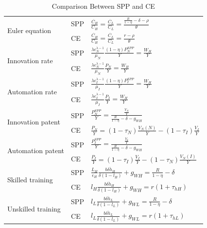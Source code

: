 \documentclass[12pt]{article}
\begin{document}
\begin{table}[h!]
\begin{center}
\scriptsize
\renewcommand{\arraystretch}{2}
\begin{tabular}{l|ll}
\hline \hline
\multirow{2}{*}{Euler equation} & SPP  &  
$\frac{\dot{C_H}}{C_H} = \frac{\dot{C_L}}{C_L} = \frac{\frac{R}{1-\eta}-\delta-\rho}{\theta}$ \\
& CE &$\frac{\dot{C_H}}{C_H} = \frac{\dot{C_L}}{C_L} = \frac{r-\rho}{\theta}$ \\\hline
\multirow{2}{*}{Innovation rate} & SPP  &  
$\frac{\lambda\epsilon_N^{\lambda-1}}{\mu_N}\frac{(1-\eta)P_N^{SPP}}{Y} = \frac{W_H}{Y} $  \\ 
& CE &$\frac{\lambda\epsilon_N^{\lambda-1}}{\mu_N}\frac{P_N}{Y}  = \frac{W_H}{Y}$ \\\hline
\multirow{2}{*}{Automation rate}  & SPP  &  
$ \frac{\lambda\epsilon_I^{\lambda-1}}{\mu_I}\frac{(1-\eta)P_I^{SPP}}{Y}  = \frac{W_H}{Y}$  \\
& CE &$ \frac{\lambda\epsilon_I^{\lambda-1}}{\mu_I}\frac{P_I}{Y}  = \frac{W_H}{Y}$ \\\hline
\multirow{2}{*}{Innovation patent} & SPP  &  
$\frac{P_N^{SPP}}{Y} = \frac{\frac{Y_N}{Y}}{\frac{R}{1-\eta}-\delta-g_{WH}}$  \\
& CE &$\frac{P_N}{Y} =(1-\tau_N)\frac{V_N(N)}{Y}-(1-\tau_I)\frac{V_I}{Y}$ \\\hline
\multirow{2}{*}{Automation patent} & SPP  &  
$\frac{P_I^{SPP}}{Y}= \frac{\frac{Y_I}{Y}}{\frac{R}{1-\eta}-\delta-g_{WH}}$  \\
& CE &$\frac{P_I}{Y}  =  (1-\tau_I)\frac{V_I}{Y}-(1-\tau_N)\frac{V_N(I)}{Y}$ \\\hline
\multirow{2}{*}{Skilled training} & SPP  &  
$\frac{L_H}{\epsilon_H}\frac{b\delta \dot{h}_H}{\delta(1-l_H)}+g_{WH} = \frac{R}{1-\eta}-\delta$  \\ 
& CE &$l_H\frac{b\delta \dot{h}_H}{\delta(1-l_H)}+g_{WH} =  r(1+\tau_{hH})$ \\\hline
\multirow{2}{*}{Unskilled training} & SPP  &  
$l_L\frac{b\delta \dot{h}_L}{\delta(1-l_L)}+g_{WL}= \frac{R}{1-\eta}-\delta$  \\ 
& CE &$l_L\frac{b\delta \dot{h}_L}{\delta(1-l_L)}+g_{WL}=  r(1+\tau_{hL})$ \\\hline
\end{tabular}
\end{center}
\renewcommand{\arraystretch}{1}
\caption{Comparison Between SPP and CE}
\label{SPP_CE}
\end{table}
\end{document}
